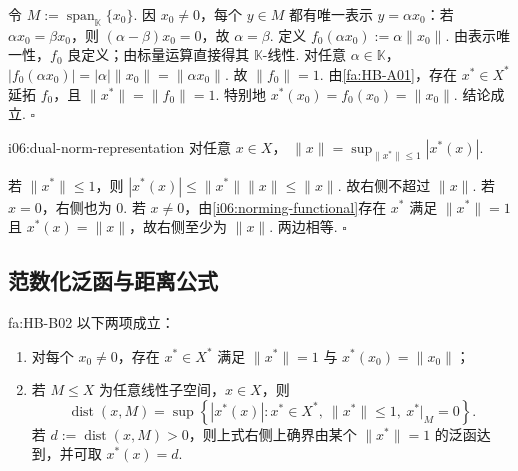 \begin{FAProof}
令 \(\displaystyle M:=\operatorname{span}_{\mathbb K}\{x_0\}\).
因 \(\displaystyle x_0\neq0\)，每个 \(\displaystyle y\in M\) 都有唯一表示 \(\displaystyle y=\alpha x_0\)：若 \(\displaystyle \alpha x_0=\beta x_0\)，则 \(\displaystyle (\alpha-\beta)x_0=0\)，故 \(\displaystyle \alpha=\beta\). 定义 \(\displaystyle f_0(\alpha x_0):=\alpha\|x_0\|\).
由表示唯一性，\(\displaystyle f_0\) 良定义；由标量运算直接得其 \(\displaystyle \mathbb K\)-线性. 对任意 \(\displaystyle \alpha\in\mathbb K\)， \(\displaystyle |f_0(\alpha x_0)| =|\alpha|\|x_0\| =\|\alpha x_0\|\).
故 \(\displaystyle \|f_0\|=1\). 由\autoref{fa:HB-A01}，存在 \(\displaystyle x^*\in X^*\) 延拓 \(\displaystyle f_0\)，且 \(\displaystyle \|x^*\|=\|f_0\|=1\). 特别地 \(\displaystyle x^*(x_0)=f_0(x_0)=\|x_0\|\).
结论成立.
\hfill\(\square\)
\end{FAProof}

\begin{FACorollary}[B][对偶范数表示]{i06:dual-norm-representation}
对任意 \(\displaystyle x\in X\)， \(\displaystyle \|x\| = \sup_{\|x^*\|\leqslant1}|x^*(x)|\).
\end{FACorollary}

\begin{FAProof}
若 \(\displaystyle \|x^*\|\leqslant1\)，则 \(\displaystyle |x^*(x)| \leqslant\|x^*\|\|x\| \leqslant\|x\|\).
故右侧不超过 \(\displaystyle \|x\|\). 若 \(\displaystyle x=0\)，右侧也为 \(\displaystyle0\). 若 \(\displaystyle x\neq0\)，由\autoref{i06:norming-functional}存在 \(\displaystyle x^*\) 满足 \(\displaystyle \|x^*\|=1\) 且 \(\displaystyle x^*(x)=\|x\|\)，故右侧至少为 \(\displaystyle \|x\|\). 两边相等.
\hfill\(\square\)
\end{FAProof}

\subsection{范数化泛函与距离公式}

\begin{FATheorem}[B][范数化泛函与距离公式]{fa:HB-B02}
以下两项成立：
\begin{enumerate}[label=\textnormal{(\roman*)}]
\item 对每个 \(\displaystyle x_0\neq0\)，存在 \(\displaystyle x^*\in X^*\) 满足 \(\displaystyle \|x^*\|=1\) 与 \(\displaystyle x^*(x_0)=\|x_0\|\)；
\item 若 \(\displaystyle M\leqslant X\) 为任意线性子空间，\(\displaystyle x\in X\)，则
\[
\operatorname{dist}(x,M)
=
\sup\left\{|x^*(x)|:x^*\in X^*,\ \|x^*\|\leqslant1,\ x^*|_M=0\right\}.
\]
若 \(\displaystyle d:=\operatorname{dist}(x,M)>0\)，则上式右侧上确界由某个 \(\displaystyle \|x^*\|=1\) 的泛函达到，并可取 \(\displaystyle x^*(x)=d\).
\end{enumerate}
\end{FATheorem}

